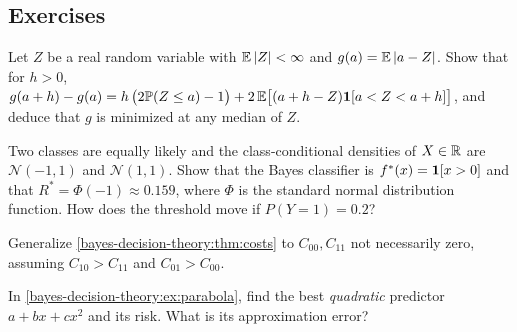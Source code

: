 \begin{notechapter}
\section*{Exercises}

\begin{exercise}\label{bayes-decision-theory:ex:median}
Let $Z$ be a real random variable with $\mathbb{E}\left|Z\right| < \infty$ and $g(a) = \mathbb{E}\left|a - Z\right|$.
Show that for $h > 0$,
$g(a+h) - g(a) = h\,\bigl(2\mathbb{P}(Z \leq a) - 1\bigr) + 2\,\mathbb{E}\bigl[(a + h - Z)\mathbf{1}[a < Z < a+h]\bigr]$,
and deduce that $g$ is minimized at any median of $Z$.
\end{exercise}

\begin{exercise}\label{bayes-decision-theory:exr:2}
Two classes are equally likely and the class-conditional densities of
$X \in \mathbb{R}$ are $\mathcal N(-1, 1)$ and $\mathcal N(1,1)$. Show that the Bayes
classifier is $f^*(x) = \mathbf{1}[x > 0]$ and that $R^* = \Phi(-1) \approx 0.159$,
where $\Phi$ is the standard normal distribution function. How does the
threshold move if $P(Y=1) = 0.2$?
\end{exercise}

\begin{exercise}\label{bayes-decision-theory:exr:3}
Generalize \cref{bayes-decision-theory:thm:costs} to $C_{00}, C_{11}$ not
necessarily zero, assuming $C_{10} > C_{11}$ and $C_{01} > C_{00}$.
\end{exercise}

\begin{exercise}\label{bayes-decision-theory:exr:4}
In \cref{bayes-decision-theory:ex:parabola}, find the best \emph{quadratic}
predictor $a + bx + cx^2$ and its risk. What is its approximation error?
\end{exercise}
\end{notechapter}
